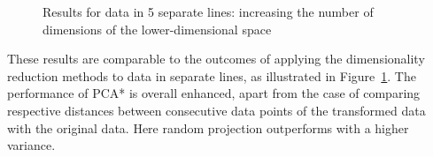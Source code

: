 \documentclass[pdftex,12pt,a4paper]{report}
\begin{document}
\begin{figure}[!htb]
    \caption{Results for data in 5 separate lines: increasing the number of dimensions of the lower-dimensional space}\label{fig:avg_dev_dyn_low_seplines}
\end{figure}

These results are comparable to the outcomes of applying the dimensionality reduction methods to data in separate lines, as illustrated in Figure~\ref{fig:avg_dev_dyn_low_seplines}.
The performance of PCA* is overall enhanced, apart from the case of comparing respective distances between consecutive data points of the transformed data with the original data.
Here random projection outperforms with a higher variance.
\end{document}
